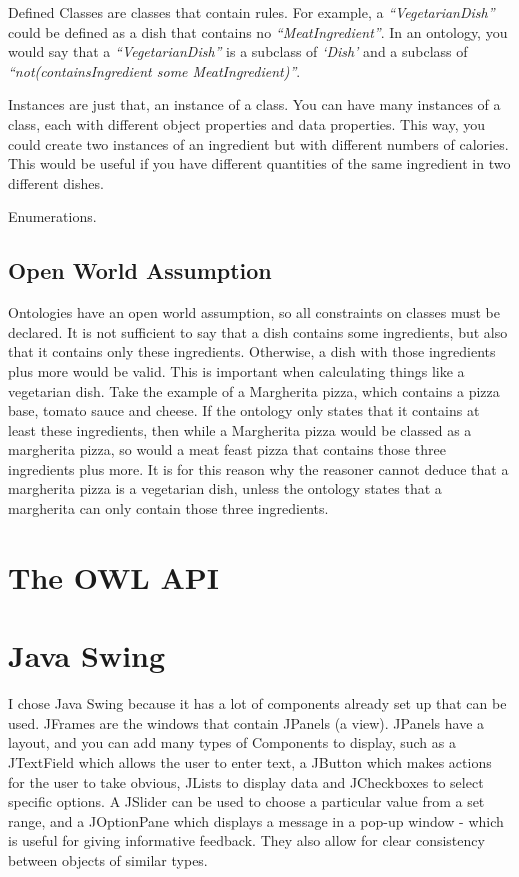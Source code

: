 Defined Classes are classes that contain rules. For example, a \textit{``VegetarianDish''} could be defined as a dish that contains no \textit{``MeatIngredient''}. In an ontology, you would say that a \textit{``VegetarianDish''} is a subclass of \textit{`Dish'} and a subclass of \textit{``not(containsIngredient some MeatIngredient)''}.

Instances are just that, an instance of a class. You can have many instances of a class, each with different object properties and data properties. This way, you could create two instances of an ingredient but with different numbers of calories. This would be useful if you have different quantities of the same ingredient in two different dishes.

Enumerations.



\subsection{Open World Assumption}

Ontologies have an open world assumption, so all constraints on classes must be declared. It is not sufficient to say that a dish contains some ingredients, but also that it contains only these ingredients. Otherwise, a dish with those ingredients plus more would be valid. This is important when calculating things like a vegetarian dish. Take the example of a Margherita pizza, which contains a pizza base, tomato sauce and cheese. If the ontology only states that it contains at least these ingredients, then while a Margherita pizza would be classed as a margherita pizza, so would a meat feast pizza that contains those three ingredients plus more. It is for this reason why the reasoner cannot deduce that a margherita pizza is a vegetarian dish, unless the ontology states that a margherita can only contain those three ingredients.

\section{The OWL API}

\section{Java Swing}

I chose Java Swing because it has a lot of components already set up that can be used. JFrames are the windows that contain JPanels (a view). JPanels have a layout, and you can add many types of Components to display, such as a JTextField which allows the user to enter text, a JButton which makes actions for the user to take obvious, JLists to display data and JCheckboxes to select specific options. A JSlider can be used to choose a particular value from a set range, and a JOptionPane which displays a message in a pop-up window - which is useful for giving informative feedback. They also allow for clear consistency between objects of similar types.

